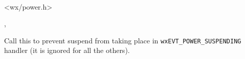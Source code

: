 \\


<wx/power.h>


, 



\label{wxpowereventveto}


Call this to prevent suspend from taking place in 
\texttt{wxEVT\_POWER\_SUSPENDING} handler (it is ignored for all the others).


